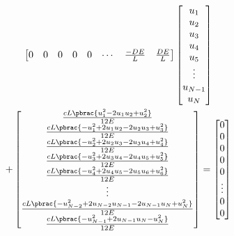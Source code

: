 \begin{multline}
\begin{bmatrix}
    0 & 0 & 0 & 0 & 0 & \cdots & \frac{-DE}{L} & \frac{DE}{L} \\
  \end{bmatrix} \begin{bmatrix}
    u_{1} \\
    u_{2} \\
    u_{3} \\
    u_{4} \\
    u_{5} \\
    \vdots \\
    u_{N-1} \\
    u_{N}
  \end{bmatrix} \\
  + \begin{bmatrix}
    \frac{cL\pbrac{u_{1}^{2}-2u_{1}u_{2}+u_{2}^{2}}}{12E} \\
    \frac{cL\pbrac{-u_{1}^{2}+2u_{1}u_{2}-2u_{2}u_{3}+u_{3}^{2}}}{12E} \\
    \frac{cL\pbrac{-u_{2}^{2}+2u_{2}u_{3}-2u_{3}u_{4}+u_{4}^{2}}}{12E} \\
    \frac{cL\pbrac{-u_{3}^{2}+2u_{3}u_{4}-2u_{4}u_{5}+u_{5}^{2}}}{12E} \\
    \frac{cL\pbrac{-u_{4}^{2}+2u_{4}u_{5}-2u_{5}u_{6}+u_{6}^{2}}}{12E} \\
    \vdots \\
    \frac{cL\pbrac{-u_{N-2}^{2}+2u_{N-2}u_{N-1}-2u_{N-1}u_{N}+u_{N}^{2}}}{12E} \\
    \frac{cL\pbrac{-u_{N-1}^{2}+2u_{N-1}u_{N}-u_{N}^{2}}}{12E}    
  \end{bmatrix} = \begin{bmatrix}
    0 \\
    0 \\
    0 \\
    0 \\
    0 \\
    \vdots \\
    0 \\
    0 \\
  \end{bmatrix}
\end{multline}

